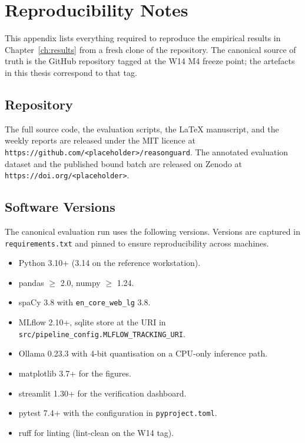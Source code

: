 \chapter{Reproducibility Notes}
\label{app:reproducibility}

This appendix lists everything required to reproduce the empirical results
in Chapter~\ref{ch:results} from a fresh clone of the repository. The
canonical source of truth is the GitHub repository tagged at the W14 M4
freeze point; the artefacts in this thesis correspond to that tag.

\section{Repository}
\label{sec:repository}

The full source code, the evaluation scripts, the LaTeX manuscript, and the
weekly reports are released under the MIT licence at
\texttt{https://github.com/<placeholder>/reasonguard}. The annotated
evaluation dataset and the published bound batch are released on Zenodo at
\texttt{https://doi.org/<placeholder>}.

\section{Software Versions}
\label{sec:software-versions}

The canonical evaluation run uses the following versions. Versions are
captured in \texttt{requirements.txt} and pinned to ensure reproducibility
across machines.

\begin{itemize}
  \item Python 3.10+ (3.14 on the reference workstation).
  \item pandas $\geq$ 2.0, numpy $\geq$ 1.24.
  \item spaCy 3.8 with \texttt{en\_core\_web\_lg} 3.8.
  \item MLflow 2.10+, sqlite store at the URI in
        \texttt{src/pipeline\_config.MLFLOW\_TRACKING\_URI}.
  \item Ollama 0.23.3 with 4-bit quantisation on a CPU-only inference
        path.
  \item matplotlib 3.7+ for the figures.
  \item streamlit 1.30+ for the verification dashboard.
  \item pytest 7.4+ with the configuration in \texttt{pyproject.toml}.
  \item ruff for linting (lint-clean on the W14 tag).
\end{itemize}

